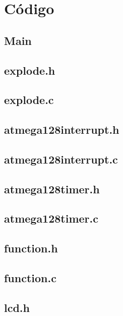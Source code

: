 \appendix
\chapter{Código}
\section*{Main}

\newpage
\section*{explode.h}

\newpage
\section*{explode.c}

\newpage
\section*{atmega128interrupt.h}

\newpage
\section*{atmega128interrupt.c}

\newpage
\section*{atmega128timer.h}

\newpage
\section*{atmega128timer.c}

\newpage
\section*{function.h}

\newpage
\section*{function.c}

\newpage
\section*{lcd.h}

\newpage
